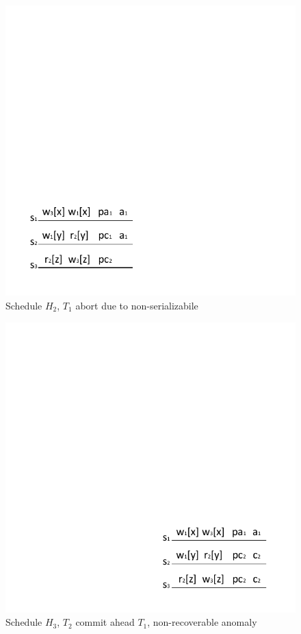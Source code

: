 \documentclass[conference]{IEEEtran}
\begin{document}
\begin{figure}[tbp]
  \centerline{\includegraphics[scale=1]{schedule_not_serializabile.pdf}}
  \caption{Schedule ${H_2}$, ${T_1}$ abort due to non-serializabile}
  \label{fig:schedule_abort_example}
\end{figure}

\begin{figure}[tbp]
  \centerline{\includegraphics[scale=1]{schedule_not_recoverable.pdf}}
  \caption{Schedule ${H_3}$, ${T_2}$ commit ahead ${T_1}$, non-recoverable anomaly}
  \label{fig:schedule_not_recoverable}
\end{figure}
\end{document}
